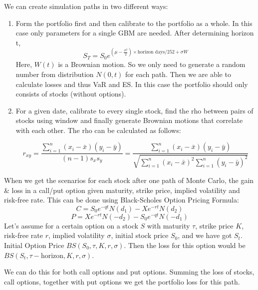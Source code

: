 \documentclass[letterpaper,11pt, oneside]{layout}
\begin{document}
We can create simulation paths in two different ways: 
\begin{enumerate}
\item Form the portfolio first and then calibrate to the portfolio as a whole. In this case only parameters for a single GBM are needed. After determining horizon t,
\begin{equation}
S_T=S_0 e^{(\mu-\frac{\sigma^2}{2})\times \text{horizon days}/252+\sigma W}
\end{equation}
Here, $W(t)$ is a Brownian motion. So we only need to generate a random number from distribution $N(0,t)$ for each path. Then we are able to calculate losses and thus VaR and ES. In this case the portfolio should only consists of stocks (without options).

\item For a given date, calibrate to every single stock, find the rho between pairs of stocks using window and finally generate Brownian motions that correlate with each other. The rho can be calculated as follows:

\begin{equation}
r_{xy}=\frac{\sum_{i=1}^n(x_i-\bar{x})(y_i-\bar{y})}{(n-1)s_xs_y}=\frac{\sum_{i=1}^n(x_i-\bar{x})(y_i-\bar{y})}{\sqrt{\sum_{i=1}^n(x_i-\bar{x})^2\sum_{i=1}^n(y_i-\bar{y})^2}}
\end{equation}
\end{enumerate}



When we get the scenarios for each stock after one path of Monte Carlo, the gain \& loss in a call/put option given maturity, strike price, implied volatility and risk-free rate. This can be done using Black-Scholes Option Pricing Formula:
\begin{equation}
C=S_0e^{-qt}N(d_1)-Xe^{-rt}N(d_2)
\end{equation}
\begin{equation}
P=Xe^{-rt}N(-d_2)-S_0e^{-qt}N(-d_1)
\end{equation}
Let’s assume for a certain option on a stock $S$ with maturity $\tau$, strike price $K$, risk-free rate $r$, implied volatility $\sigma$, initial stock price $S_0$, and we have got $S_t$. Initial Option Price $BS(S_0, \tau, K, r, \sigma)$. Then the loss for this option would be $BS(S_t, \tau-\text{horizon}, K, r, \sigma)$.

We can do this for both call options and put options. Summing the loss of stocks, call options, together with put options we get the portfolio loss for this path.
\end{document}
